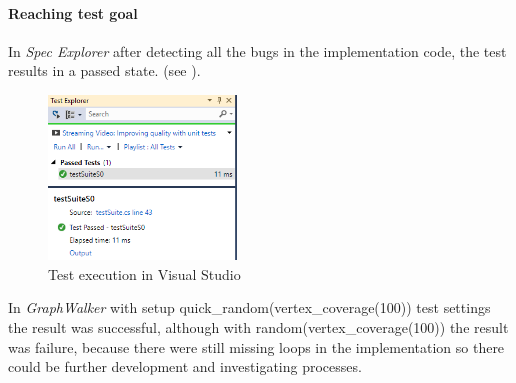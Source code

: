 \paragraph{Reaching test goal}
In \textit{Spec Explorer} after detecting all the bugs in the implementation code, the test results in a passed state. (see ).
\begin{figure}[!ht]
	\centering
	\includegraphics[width=50mm, keepaspectratio]{figures/specexplorerTestPassed.png}
	\caption{Test execution in Visual Studio}
	\label{fig:SpecExpRunPassed}
\end{figure}

In \textit{GraphWalker} with setup quick\_random(vertex\_coverage(100)) test settings the result was successful, although with random(vertex\_coverage(100)) the result was failure, because there were still missing loops in the implementation so there could be further development and investigating processes.

